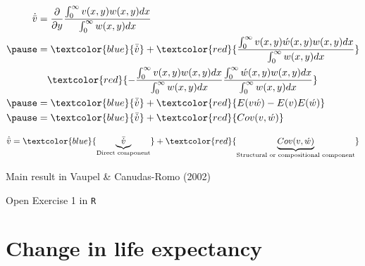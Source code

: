 \documentclass[xcolor={dvipsnames}]{beamer}
\begin{document}
\begin{frame}
\end{frame}

\begin{frame}
\large{
\[
  \begin{aligned}
  \dot{\bar{v}} &= \frac{\partial}{\partial y} \frac{\int_0^\infty v(x,y)w(x,y)dx}{\int_0^\infty w(x,y)dx}\\ \pause
                &= \textcolor{blue}{\bar{\dot{v}}} + \textcolor{red}{\frac{\int_0^\infty v(x,y)\acute{w}(x,y)w(x,y)dx}{\int_0^\infty w(x,y)dx}} \\
                & \quad \textcolor{red}{ - \frac{\int_0^\infty v(x,y)w(x,y)dx}{\int_0^\infty w(x,y)dx}\frac{\int_0^\infty \acute{w}(x,y) w(x,y) dx}{\int_0^\infty w(x,y)dx}} \\ \pause
                &= \textcolor{blue}{\bar{\dot{v}}} + \textcolor{red}{E(v\acute{w})-E(v)E(\acute{w})} \\ \pause
                &= \textcolor{blue}{\bar{\dot{v}}} + \textcolor{red}{Cov(v,\acute{w})}
  \end{aligned}
\]
}
\end{frame}

\begin{frame}
\Large{

  \begin{equation}
  \dot{\bar{v}} = \textcolor{blue}{ \underbrace{\bar{\dot{v}}}_{\text{Direct component}} } + \textcolor{red}{ \underbrace{Cov(v,\acute{w})}_{\text{Structural or compositional component}}}
    \end{equation}

\pause
Main result in Vaupel \& Canudas-Romo (2002)
}
\end{frame}


\begin{frame}
\Large{
Open Exercise 1 in \texttt{R}
}
\end{frame}

\section{Change in life expectancy}
\end{document}
